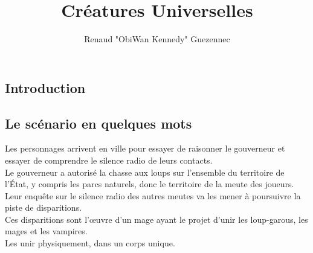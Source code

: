 \documentclass[oneside,12pt]{book}
\title{Créatures Universelles}
\author{Renaud "ObiWan Kennedy" Guezennec}
\date{}
\begin{document}
\maketitle \clearpage
\tableofcontents \clearpage

\begin{flushleft}
    \chapter{Introduction}
    \section{Le scénario en quelques mots}
Les personnages arrivent en ville pour essayer de raisonner le gouverneur et essayer de comprendre le silence radio de leurs contacts.\\
Le gouverneur a autorisé la chasse aux loups sur l’ensemble du territoire de l’État, y compris les parcs naturels, donc le territoire de la meute des joueurs. \\
Leur enquête sur le silence radio des autres meutes va les mener à poursuivre la piste de disparitions. \\
Ces disparitions sont l’œuvre d’un mage ayant le projet d’unir les loup-garous, les mages et les vampires. \\
Les unir physiquement, dans un corps unique.

\end{flushleft}
\end{document}
